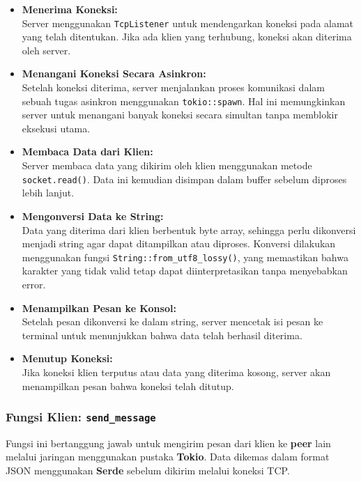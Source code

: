 \begin{itemize}
	\item \textbf{Menerima Koneksi:} \\
	Server menggunakan \texttt{TcpListener} untuk mendengarkan koneksi pada alamat yang telah ditentukan. Jika ada klien yang terhubung, koneksi akan diterima oleh server.
	
	\item \textbf{Menangani Koneksi Secara Asinkron:} \\
	Setelah koneksi diterima, server menjalankan proses komunikasi dalam sebuah tugas asinkron menggunakan \texttt{tokio::spawn}. Hal ini memungkinkan server untuk menangani banyak koneksi secara simultan tanpa memblokir eksekusi utama.
	
	\item \textbf{Membaca Data dari Klien:} \\
	Server membaca data yang dikirim oleh klien menggunakan metode \texttt{socket.read()}. Data ini kemudian disimpan dalam buffer sebelum diproses lebih lanjut.
	
	\item \textbf{Mengonversi Data ke String:} \\
	Data yang diterima dari klien berbentuk byte array, sehingga perlu dikonversi menjadi string agar dapat ditampilkan atau diproses. Konversi dilakukan menggunakan fungsi \texttt{String::from\_utf8\_lossy()}, yang memastikan bahwa karakter yang tidak valid tetap dapat diinterpretasikan tanpa menyebabkan error.
	
	\item \textbf{Menampilkan Pesan ke Konsol:} \\
	Setelah pesan dikonversi ke dalam string, server mencetak isi pesan ke terminal untuk menunjukkan bahwa data telah berhasil diterima.
	
	\item \textbf{Menutup Koneksi:} \\
	Jika koneksi klien terputus atau data yang diterima kosong, server akan menampilkan pesan bahwa koneksi telah ditutup.
\end{itemize}


\subsubsection{Fungsi Klien: \texttt{send\_message}}

Fungsi ini bertanggung jawab untuk mengirim pesan dari klien ke \textbf{peer} lain melalui jaringan menggunakan pustaka \textbf{Tokio}. Data dikemas dalam format JSON menggunakan \textbf{Serde} sebelum dikirim melalui koneksi TCP.


